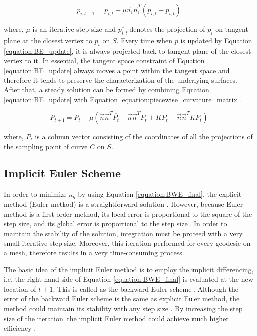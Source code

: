 \begin{equation}
p_{i,t+1}=p_{i,t}+\mu\vec{n}_{i}\vec{n}_{i}^{T}\left ( \overline{p_{i,t}} - p_{i,t} \right )
\label{equation:BE_update}
\end{equation}

where, $\mu$ is an iterative step size and $\overline{p_{i,t}}$ denotes the projection of $p_i$ on tangent plane at the closest vertex to $p_{i}$ on $S$. Every time when $p$ is updated by Equation \ref{equation:BE_update}, it is always projected back to tangent plane of the closest vertex to it. In essential, the tangent space constraint of Equation \ref{equation:BE_update} always moves a point within the tangent space and therefore it tends to preserve the characterization of the underlying surfaces. After that, a steady solution can be formed by combining Equation \ref{equation:BE_update} with Equation \ref{equation:piecewise_curvature_matrix}.

\begin{equation}
P_{t+1}=P_{t}+\mu(\vec{n}\vec{n}^{T}\overline{P_{t}} - \vec{n}\vec{n}^{T}P_t+KP_t-\vec{n}\vec{n}^{T}KP_t)
\label{equation:BWE_final}
\end{equation}

where, $\overline{P_{t}}$ is a column vector consisting of the coordinates of all the projections of the sampling point of curve $C$ on $S$.

\subsection{Implicit Euler Scheme}

In order to minimize $\kappa_g$ by using Equation \ref{equation:BWE_final}, the explicit method (Euler method) is a straightforward solution . However, because Euler method is a first-order method, its local error is proportional to the square of the step size, and its global error is proportional to the step size . In order to maintain the stability of the solution, integration must be proceed with a very small iterative step size. Moreover, this iteration performed for every geodesic on a mesh, therefore results in a very time-consuming process. 

The basic idea of the implicit Euler method is to employ the implicit differencing, i.e, the right-hand side of Equation \ref{equation:BWE_final} is evaluated at the new location of $t+1$. This is called as the backward Euler scheme . Although the error of the backward Euler scheme is the same as explicit Euler method, the method could maintain its stability with any step size . By increasing the step size of the iteration, the implicit Euler method could achieve much higher efficiency .

